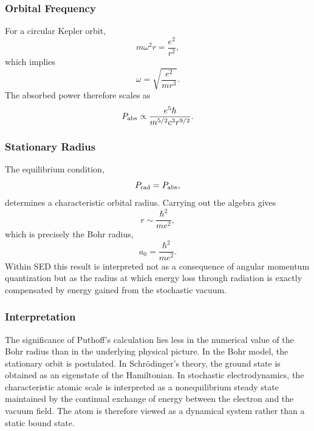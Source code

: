 \subsubsection{Orbital Frequency}
For a circular Kepler orbit,
\begin{equation}
m\omega^2r=\frac{e^2}{r^2},
\end{equation}
which implies
\begin{equation}
\omega=\sqrt{\frac{e^2}{mr^3}}.
\label{eq:KeplerFrequency}
\end{equation}
The absorbed power therefore scales as
\begin{equation}
P_{\rm abs}\propto\frac{e^5\hbar}{m^{5/2}c^3r^{9/2}}.
\end{equation}
\subsubsection{Stationary Radius}
The equilibrium condition,
\[P_{\rm rad}=P_{\rm abs},\]
determines a characteristic orbital radius.
Carrying out the algebra gives
\begin{equation}
r\sim\frac{\hbar^2}{me^2},
\end{equation}
which is precisely the Bohr radius,
\begin{equation}
\boxed{a_0=\frac{\hbar^2}{me^2}.}
\end{equation}
Within SED this result is interpreted not as a consequence of angular
momentum quantization but as the radius at which energy loss through
radiation is exactly compensated by energy gained from the stochastic
vacuum.
\subsubsection{Interpretation}
The significance of Puthoff's calculation lies less in the numerical
value of the Bohr radius than in the underlying physical picture.
In the Bohr model, the stationary orbit is postulated.
In Schrödinger's theory, the ground state is obtained as an eigenstate
of the Hamiltonian.
In stochastic electrodynamics, the characteristic atomic scale is
interpreted as a nonequilibrium steady state maintained by the continual
exchange of energy between the electron and the vacuum field.
The atom is therefore viewed as a dynamical system rather than a static
bound state.
